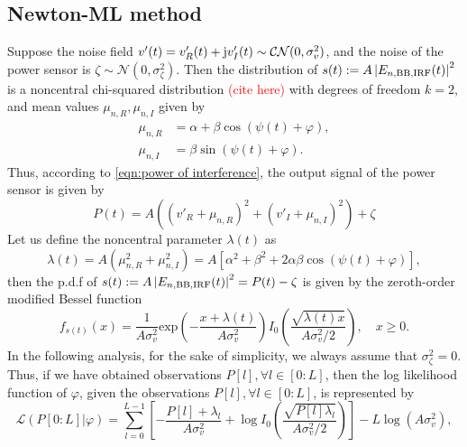 \documentclass[12pt,draftclsnofoot,journal,onecolumn]{IEEEtran}
\theoremstyle{nonumberplain}
\def \exp {\text{exp}}
\def \ch {\textcolor{red}{(cite here) }}
\begin{document}
\subsection{Newton-ML method}  \label{ML method}
    Suppose the noise field $v'(t)=v'_R(t) + {\rm j}v'_I(t)\sim \mathcal{CN}(0, \sigma_v^2)$, and the noise of the power sensor is $\zeta \sim \mathcal{N}(0, \sigma_{\zeta}^2)$. Then the distribution of $s(t) := A\left|E_{n, {\rm BB}, {\rm IRF}}(t)\right|^2$ is a noncentral chi-squared distribution \ch with degrees of freedom $k=2$, and mean values $\mu_{n,R}, \mu_{n,I}$ given by
    \begin{subequations}
    \label{chi2 distribution mean values}
        \begin{align}
        \label{mu_n,R}
        \mu_{n,R} & = \alpha + \beta \cos(\psi(t)+\varphi),\\
        \label{mu_n,L}
        \mu_{n,I} & = \beta \sin(\psi(t)+\varphi).
        \end{align}
    \end{subequations}
    Thus, according to \eqref{eqn:power of interference}, the output signal of the power sensor is given by 
    \begin{equation}
        P(t)  = A\left((v'_{R} + \mu_{n,R})^2 + (v'_{I} + \mu_{n,I})^2 \right)+ \zeta 
        \label{eqn:sensor power}
    \end{equation}
    Let us define the noncentral parameter $\lambda(t)$ as
    \begin{equation}
        \lambda(t)  = A(\mu_{n,R}^2 + \mu_{n,I}^2) = A\left[\alpha^{2}+\beta^{2}+2\alpha\beta\cos\left(\psi(t)+\varphi\right)\right],
    \end{equation}
    then the p.d.f of $s(t)  := A\left|E_{n, {\rm BB}, {\rm IRF}}(t)\right|^2 = P(t)-\zeta$ is given by the zeroth-order modified Bessel function
    \begin{equation}
        f_{s(t)}(x) = \frac{1}{A\sigma_{v}^2} \exp\left(-\frac{x+\lambda(t)}{A\sigma_v^2}\right)I_{0}\left(\frac{\sqrt{\lambda(t) x}}{A\sigma_v^2/2}\right),\quad x \geq 0.
        \label{ML single observation}
    \end{equation}
    In the following analysis, for the sake of simplicity, we always assume that $\sigma_{\zeta}^2 = 0$. Thus, if we have obtained observations $P[l], \forall l\in [0:L]$, then the log likelihood function of $\varphi$, given the observations $P[l], \forall l\in [0:L]$, is represented by
    \begin{equation}
        \mathcal{L}(P[0:L] | \varphi) = \sum_{l=0}^{L-1}\left[-\frac{P[l] + \lambda_l}{A\sigma_v^2} + \log I_0\left(\frac{\sqrt{P[l] \lambda_l}}{A\sigma_v^2/2}\right)\right] - L\log(A\sigma_v^2),
        \label{ML likelihood}
    \end{equation}
\end{document}
